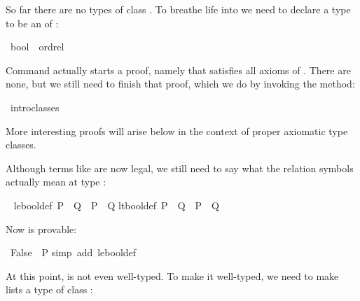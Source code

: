 \begin{isabellebody}
\begin{isamarkuptext}
So far there are no types of class . To breathe life
into  we need to declare a type to be an  of
:%
\end{isamarkuptext}%
\isamarkuptrue%
\isamarkupfalse%
\ bool\ {\isacharcolon}{\isacharcolon}\ ordrel%
\isadelimproof
%
\endisadelimproof
%
\isatagproof
%
\begin{isamarkuptxt}%
\noindent
Command  actually starts a proof, namely that
 satisfies all axioms of .
There are none, but we still need to finish that proof, which we do
by invoking the  method:%
\end{isamarkuptxt}%
\isamarkuptrue%
\isamarkupfalse%
\ intro{\isacharunderscore}classes%
\endisatagproof
{\isafoldproof}%
%
\isadelimproof
%
\endisadelimproof
%
\begin{isamarkuptext}%
\noindent
More interesting  proofs will arise below
in the context of proper axiomatic type classes.

Although terms like  are now legal, we still need to say
what the relation symbols actually mean at type :%
\end{isamarkuptext}%
\isamarkuptrue%
\isamarkupfalse%
\ {\isacharparenleft}\isanewline
le{\isacharunderscore}bool{\isacharunderscore}def{\isacharcolon}\ {\isachardoublequoteopen}P\ {\isacharless}{\isacharless}{\isacharequal}\ Q\ {\isasymequiv}\ P\ {\isasymlongrightarrow}\ Q{\isachardoublequoteclose}\isanewline
lt{\isacharunderscore}bool{\isacharunderscore}def{\isacharcolon}\ {\isachardoublequoteopen}P\ {\isacharless}{\isacharless}\ Q\ {\isasymequiv}\ {\isasymnot}P\ {\isasymand}\ Q{\isachardoublequoteclose}%
\begin{isamarkuptext}%
\noindent
Now  is provable:%
\end{isamarkuptext}%
\isamarkuptrue%
\isamarkupfalse%
\ {\isachardoublequoteopen}False\ {\isacharless}{\isacharless}{\isacharequal}\ P{\isachardoublequoteclose}\isanewline
%
\isadelimproof
%
\endisadelimproof
%
\isatagproof
{}\isamarkupfalse%
{\isacharparenleft}simp\ add{\isacharcolon}\ le{\isacharunderscore}bool{\isacharunderscore}def{\isacharparenright}%
\endisatagproof
{\isafoldproof}%
%
\isadelimproof
%
\endisadelimproof
%
\begin{isamarkuptext}%
\noindent
At this point, \isa{{\isacharbrackleft}{\isacharbrackright}\ {\isacharless}{\isacharless}{\isacharequal}\ {\isacharbrackleft}{\isacharbrackright}} is not even well-typed.
To make it well-typed,
we need to make lists a type of class :%
\end{isamarkuptext}%
\isamarkuptrue%
%
\isadelimtheory
%
\endisadelimtheory
%
\isatagtheory
%
\endisatagtheory
{\isafoldtheory}%
%
\isadelimtheory
%
\endisadelimtheory
\end{isabellebody}%
